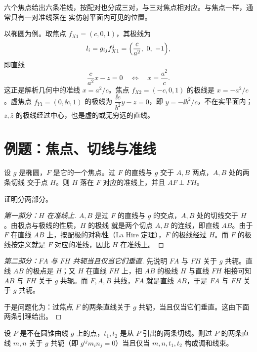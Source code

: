 六个焦点给出六条准线，按配对也分成三对，与三对焦点相对应。与焦点一样，通常只有一对准线落在
实仿射平面内可见的位置。

以椭圆为例。取焦点 $f_{X1}=(c,0,1)$，其极线为
\[
l_i=g_{ij}f_{X1}^j=\Bigl(\frac{c}{a^2},\ 0,\ -1\Bigr),
\]
即直线
\[
\frac{c}{a^2}x-z=0
\quad\Longleftrightarrow\quad
x=\frac{a^2}{c}.
\]
这正是解析几何中的准线 $x=a^2/c$。焦点 $f_{X2}=(-c,0,1)$ 的极线是 $x=-a^2/c$。虚焦点
$f_{Y1}=(0,\ii c,1)$ 的极线为 $\dfrac{\ii c}{b^2}y-z=0$，即
$y=-\ii b^2/c$，不在实平面内；$z,\bar z$ 的极线经过中心，也是虚的或无穷远的直线。

\section{例题：焦点、切线与准线}

\begin{example}\label{ex:focus-directrix}
设 $g$ 是椭圆，$F$ 是它的一个焦点。过 $F$ 的直线与 $g$ 交于 $A,B$ 两点，$A,B$ 处的两条切线
交于点 $H$。则 $H$ 落在 $F$ 对应的准线上，并且 $AF\perp FH$。
\end{example}

证明分两部分。

\begin{proof}[第一部分：$H$ 在准线上]
$A,B$ 是过 $F$ 的直线与 $g$ 的交点，$A,B$ 处的切线交于 $H$。由极点与极线的性质，$H$ 的极线
就是两个切点 $A,B$ 的连线，即直线 $AB$。由于 $F$ 在直线 $AB$ 上，按配极的对称性（La Hire
定理），$F$ 的极线经过 $H$。而 $F$ 的极线按定义就是 $F$ 对应的准线，因此 $H$ 在准线上。
\end{proof}

\begin{proof}[第二部分：$FA$ 与 $FH$ 共轭当且仅当它们垂直]
先说明 $FA$ 与 $FH$ 关于 $g$ 共轭。直线 $AB$ 的极点是 $H$；又 $H$ 在直线 $FH$ 上，把 $AB$
的极线 $H$ 与直线 $FH$ 相接可知 $AB$ 与 $FH$ 关于 $g$ 共轭。而 $F,A,B$ 共线，$FA$ 就是直线
$AB$，于是 $FA$ 与 $FH$ 关于 $g$ 共轭。

于是问题化为：过焦点 $F$ 的两条直线关于 $g$ 共轭，当且仅当它们垂直。这由下面两条引理给出。
\end{proof}

\begin{lemma}\label{lem:conj-harmonic}
设 $P$ 是不在圆锥曲线 $g$ 上的点，$t_1,t_2$ 是从 $P$ 引出的两条切线。则过 $P$ 的两条直线
$m,n$ 关于 $g$ 共轭（即 $g^{ij}m_in_j=0$）当且仅当 $m,n,t_1,t_2$ 构成调和线束。
\end{lemma}

